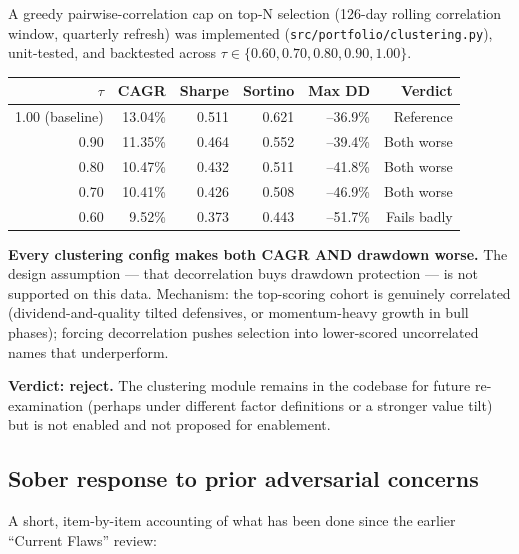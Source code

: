 \documentclass[11pt,a4paper]{article}
\begin{document}
A greedy pairwise-correlation cap on top-N selection (126-day rolling correlation window, quarterly refresh) was implemented (\texttt{src/portfolio/clustering.py}), unit-tested, and backtested across $\tau \in \{0.60, 0.70, 0.80, 0.90, 1.00\}$.

\begin{table}[H]
\centering
\renewcommand{\arraystretch}{1.3}
\begin{tabular}{rrrrrr}
\toprule
$\tau$ & CAGR & Sharpe & Sortino & Max DD & Verdict \\
\midrule
1.00 (baseline) & 13.04\% & 0.511 & 0.621 & --36.9\% & Reference \\
0.90 & 11.35\% & 0.464 & 0.552 & --39.4\% & Both worse \\
0.80 & 10.47\% & 0.432 & 0.511 & --41.8\% & Both worse \\
0.70 & 10.41\% & 0.426 & 0.508 & --46.9\% & Both worse \\
0.60 & 9.52\% & 0.373 & 0.443 & --51.7\% & Fails badly \\
\bottomrule
\end{tabular}
\end{table}

\textbf{Every clustering config makes both CAGR AND drawdown worse.} The design assumption --- that decorrelation buys drawdown protection --- is not supported on this data. Mechanism: the top-scoring cohort is genuinely correlated (dividend-and-quality tilted defensives, or momentum-heavy growth in bull phases); forcing decorrelation pushes selection into lower-scored uncorrelated names that underperform.

\textbf{Verdict: reject.} The clustering module remains in the codebase for future re-examination (perhaps under different factor definitions or a stronger value tilt) but is not enabled and not proposed for enablement.

\subsection{Sober response to prior adversarial concerns}

A short, item-by-item accounting of what has been done since the earlier ``Current Flaws'' review:
\end{document}
